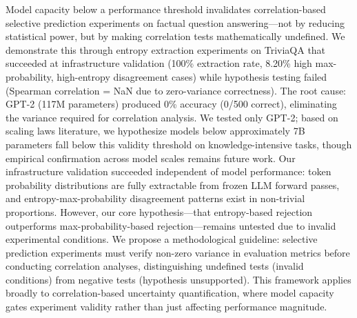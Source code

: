
Model capacity below a performance threshold invalidates correlation-based selective prediction experiments on factual question answering---not by reducing statistical power, but by making correlation tests mathematically undefined. We demonstrate this through entropy extraction experiments on TriviaQA that succeeded at infrastructure validation (100\% extraction rate, 8.20\% high max-probability, high-entropy disagreement cases) while hypothesis testing failed (Spearman correlation = NaN due to zero-variance correctness). The root cause: GPT-2 (117M parameters) produced 0\% accuracy (0/500 correct), eliminating the variance required for correlation analysis. We tested only GPT-2; based on scaling laws literature, we hypothesize models below approximately 7B parameters fall below this validity threshold on knowledge-intensive tasks, though empirical confirmation across model scales remains future work. Our infrastructure validation succeeded independent of model performance: token probability distributions are fully extractable from frozen LLM forward passes, and entropy-max-probability disagreement patterns exist in non-trivial proportions. However, our core hypothesis---that entropy-based rejection outperforms max-probability-based rejection---remains untested due to invalid experimental conditions. We propose a methodological guideline: selective prediction experiments must verify non-zero variance in evaluation metrics before conducting correlation analyses, distinguishing undefined tests (invalid conditions) from negative tests (hypothesis unsupported). This framework applies broadly to correlation-based uncertainty quantification, where model capacity gates experiment validity rather than just affecting performance magnitude.
